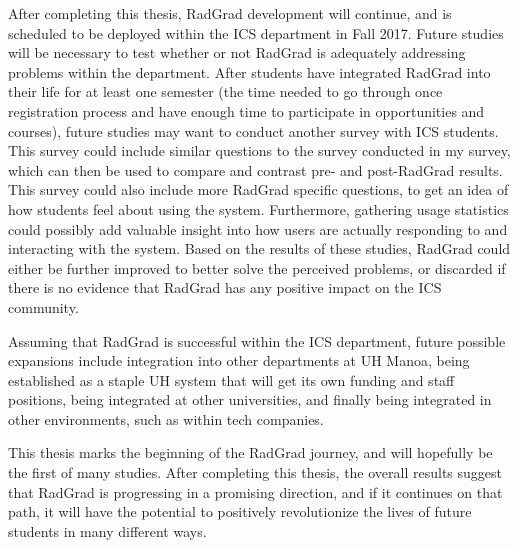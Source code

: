 After completing this thesis, RadGrad development will continue, and is scheduled to be deployed within the ICS department in Fall 2017. Future studies will be necessary to test whether or not RadGrad is adequately addressing problems within the department. After students have integrated RadGrad into their life for at least one semester (the time needed to go through once registration process and have enough time to participate in opportunities and courses), future studies may want to conduct another survey with ICS students. This survey could include similar questions to the survey conducted in my survey, which can then be used to compare and contrast pre- and post-RadGrad results. This survey could also include more RadGrad specific questions, to get an idea of how students feel about using the system. Furthermore, gathering usage statistics could possibly add valuable insight into how users are actually responding to and interacting with the system. Based on the results of these studies, RadGrad could either be further improved to better solve the perceived problems, or discarded if there is no evidence that RadGrad has any positive impact on the ICS community.

Assuming that RadGrad is successful within the ICS department, future possible expansions include integration into other departments at UH Manoa, being established as a staple UH system that will get its own funding and staff positions, being integrated at other universities, and finally being integrated in other environments, such as within tech companies. 

This thesis marks the beginning of the RadGrad journey, and will hopefully be the first of many studies. After completing this thesis, the overall results suggest that RadGrad is progressing in a promising direction, and if it continues on that path, it will have the potential to positively revolutionize the lives of future students in many different ways.   